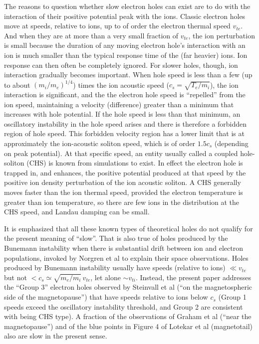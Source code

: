 \documentclass[12pt]{article}
\begin{document}
The reasons to question whether slow electron holes can exist are to
do with the interaction of their positive potential peak with the
ions. Classic electron holes move at speeds, relative to ions, up to
of order the electron thermal speed
$v_{te}$\cite{Schamel1986a,Hutchinson2017}. And when they are at more
than a very small fraction of $v_{te}$, the ion perturbation is small
because the duration of any moving electron hole's interaction with an
ion is much smaller than the typical response time of the (far
heavier) ions. Ion response can then often be completely ignored. For
slower holes, though, ion interaction gradually becomes important.
When hole speed is less than a few (up to about $(m_i/m_e)^{1/4}$) times the ion
acoustic speed ($c_s=\sqrt{T_e/m_i}$), the ion interaction is
significant, and the the electron hole speed is ``repelled'' from the
ion speed\cite{Hutchinson2016,Zhou2016}, maintaining a velocity
(difference) greater than a minimum that increases with hole
potential. If the hole speed is less than that minimum, an oscillatory
instability in the hole speed arises\cite{Zhou2017} and there is
therefore a forbidden region of hole speed. This forbidden velocity
region has a lower limit that is at approximately the ion-acoustic
soliton speed, which is of order $1.5c_s$ (depending on peak
potential). At that specific speed, an entity usually called a coupled
hole-soliton (CHS) is known from
simulations\cite{Saeki1991,Saeki1998,Zhou2018} to exist. In effect the
electron hole is trapped in, and enhances, the positive potential
produced at that speed by the positive ion density perturbation of the
ion acoustic soliton. A CHS generally moves faster than the ion
thermal speed, provided the electron temperature is greater than ion
temperature, so there are few ions in the distribution at the CHS
speed, and Landau damping can be small.

It is emphasized that all these known types of theoretical holes do
not qualify for the present meaning of ``slow''. That is also true of
holes produced by the Bunemann instability when there is substantial
drift between ion and electron populations, invoked by Norgren et
al\cite{Norgren2015,Norgren2015a} to explain their space
observations. Holes produced\cite{Drake2003,Zhou2018} by Bunemann
instability usually have speeds (relative to ions) $\ll v_{te}$ but not
$<c_s\simeq\sqrt{m_e/m_i}\,v_{te}$, let alone $\sim v_{ti}$.  Instead,
the present paper addresses the ``Group 3'' electron holes observed by
Steinvall et al\cite{Steinvall2019} (``on the magnetospheric side of
the magnetopause'') that have speeds relative to ions below $c_s$
(Group 1 speeds exceed the oscillatory instability threshold, and
Group 2 are consistent with being CHS type). A fraction of
the observations of Graham et al\cite{Graham2016} (``near the
magnetopause'') and of the blue points in Figure 4 of Lotekar et
al\cite{Lotekar2020} (magnetotail) also are slow in the present sense.
\end{document}
